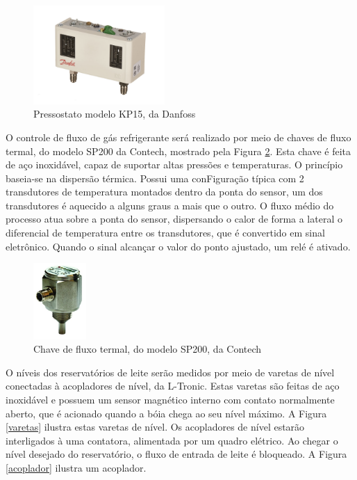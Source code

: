 \documentclass[10pt,a4paper]{article}
\begin{document}
\begin{figure}[H]
    \centering
    \includegraphics[width=5cm]{Figuras/danfoss.jpg}
    \caption{Pressostato modelo KP15, da Danfoss}
    \label{danfoss}
\end{figure}

O controle de fluxo de gás refrigerante será realizado por meio de chaves de fluxo termal, do modelo SP200 da Contech, mostrado pela Figura \ref{fluxo}. Esta chave é feita de aço inoxidável, capaz de suportar altas pressões e temperaturas. O princípio baseia-se na dispersão térmica. Possui uma conFiguração típica com 2 transdutores de temperatura montados dentro da ponta do sensor, um dos transdutores é aquecido a alguns graus a mais que o outro. O fluxo médio do processo atua sobre a ponta do sensor, dispersando o calor de forma a lateral o diferencial de temperatura entre os transdutores, que é convertido em sinal eletrônico. Quando o sinal alcançar o valor do ponto ajustado, um relé é ativado.

\begin{figure}[b!]
    \centering
    \includegraphics[width=2cm]{Figuras/fluxo.jpg}
    \caption{Chave de fluxo termal, do modelo SP200, da Contech}
    \label{fluxo}
\end{figure}

\newpage
O níveis dos reservatórios de leite serão medidos por meio de varetas de nível conectadas à acopladores de nível, da L-Tronic. Estas varetas são feitas de aço inoxidável e possuem um sensor magnético interno com contato normalmente aberto, que é acionado quando a bóia chega ao seu nível máximo. A Figura \ref{varetas} ilustra estas varetas de nível. Os acopladores de nível estarão interligados à uma contatora, alimentada por um quadro elétrico. Ao chegar o nível desejado do reservatório, o fluxo de entrada de leite é bloqueado. A Figura \ref{acoplador} ilustra um acoplador.
\end{document}
